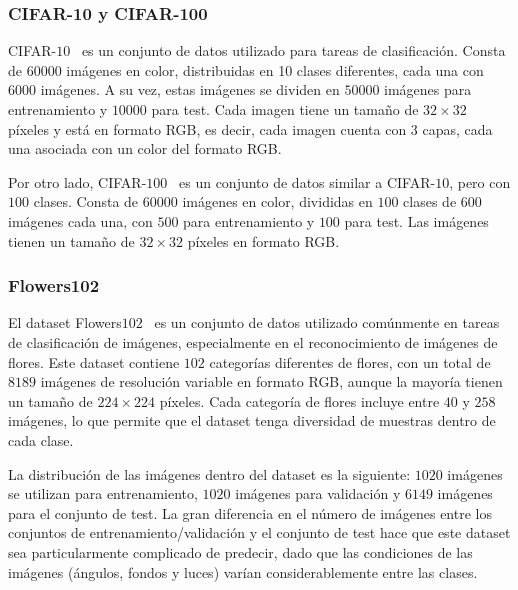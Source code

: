 \subsubsection{CIFAR-10 y CIFAR-100}\label{subsubsec:CIFAR10-y-CIFAR100}

CIFAR-$10$~\cite{Krizhevsky2009} es un conjunto de datos utilizado para tareas de clasificación. Consta de $60000$ imágenes en color, distribuidas en 10 clases diferentes, cada una con $6000$ imágenes. A su vez, estas imágenes se dividen en $50000$ imágenes para entrenamiento y $10000$ para test. Cada imagen tiene un tamaño de $32 \times 32$ píxeles y está en formato RGB, es decir, cada imagen cuenta con $3$ capas, cada una asociada con un color del formato RGB.\newline

Por otro lado, CIFAR-$100$~\cite{Krizhevsky2009} es un conjunto de datos similar a CIFAR-$10$, pero con $100$ clases. Consta de $60000$ imágenes en color, divididas en $100$ clases de $600$ imágenes cada una, con $500$ para entrenamiento y $100$ para test. Las imágenes tienen un tamaño de $32 \times 32$ píxeles en formato RGB.\newline

\subsubsection{Flowers102}\label{subsubsec:Flowers102}

El dataset Flowers$102$~\cite{Nilsback2008} es un conjunto de datos utilizado comúnmente en tareas de clasificación de imágenes, especialmente en el reconocimiento de imágenes de flores. Este dataset contiene $102$ categorías diferentes de flores, con un total de $8189$ imágenes de resolución variable en formato RGB, aunque la mayoría tienen un tamaño de $224 \times 224$ píxeles. Cada categoría de flores incluye entre $40$ y $258$ imágenes, lo que permite que el dataset tenga diversidad de muestras dentro de cada clase.\newline

La distribución de las imágenes dentro del dataset es la siguiente: $1020$ imágenes se utilizan para entrenamiento, $1020$ imágenes para validación y $6149$ imágenes para el conjunto de test. La gran diferencia en el número de imágenes entre los conjuntos de entrenamiento/validación y el conjunto de test hace que este dataset sea particularmente complicado de predecir, dado que las condiciones de las imágenes (ángulos, fondos y luces) varían considerablemente entre las clases.\newline

